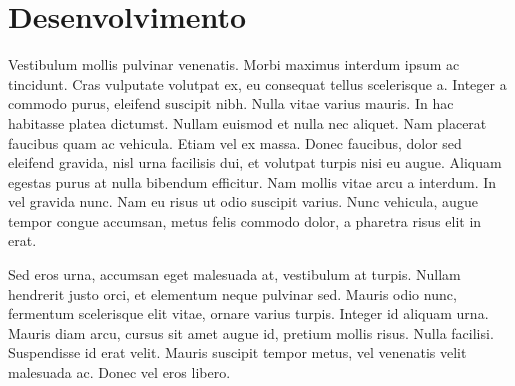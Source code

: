 \chapter[Desenvolvimento]{Desenvolvimento}

Vestibulum mollis pulvinar venenatis. Morbi maximus interdum ipsum ac tincidunt. Cras vulputate volutpat ex, eu consequat tellus scelerisque a. Integer a commodo purus, eleifend suscipit nibh. Nulla vitae varius mauris. In hac habitasse platea dictumst. Nullam euismod et nulla nec aliquet. Nam placerat faucibus quam ac vehicula. Etiam vel ex massa. Donec faucibus, dolor sed eleifend gravida, nisl urna facilisis dui, et volutpat turpis nisi eu augue. Aliquam egestas purus at nulla bibendum efficitur. Nam mollis vitae arcu a interdum. In vel gravida nunc. Nam eu risus ut odio suscipit varius. Nunc vehicula, augue tempor congue accumsan, metus felis commodo dolor, a pharetra risus elit in erat.

Sed eros urna, accumsan eget malesuada at, vestibulum at turpis. Nullam hendrerit justo orci, et elementum neque pulvinar sed. Mauris odio nunc, fermentum scelerisque elit vitae, ornare varius turpis. Integer id aliquam urna. Mauris diam arcu, cursus sit amet augue id, pretium mollis risus. Nulla facilisi. Suspendisse id erat velit. Mauris suscipit tempor metus, vel venenatis velit malesuada ac. Donec vel eros libero.